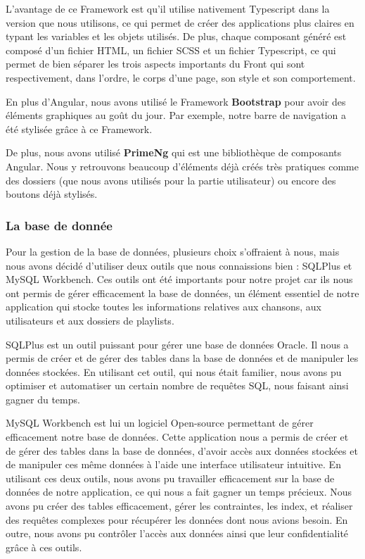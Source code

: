 \documentclass[12pt,french]{article}
\begin{document}
\medskip

L'avantage de ce \gls{Framework} est qu'il utilise nativement \gls{Typescript} dans la version que nous utilisons, ce qui permet de créer des applications plus claires en typant les variables et les objets utilisés. De plus, chaque composant généré est composé d'un fichier \gls{HTML}, un fichier \gls{SCSS} et un fichier \gls{Typescript}, ce qui permet de bien séparer les trois aspects importants du \gls{Front} qui sont respectivement, dans l'ordre, le corps d'une page, son style et son comportement.

\bigskip

En plus d'Angular, nous avons utilisé le \gls{Framework} \textbf{Bootstrap} pour avoir des éléments graphiques au goût du jour. Par exemple, notre barre de navigation a été stylisée grâce à ce \gls{Framework}.

De plus, nous avons utilisé \textbf{PrimeNg} qui est une bibliothèque de composants Angular. Nous y retrouvons beaucoup d'éléments déjà créés très pratiques comme des dossiers (que nous avons utilisés pour la partie utilisateur) ou encore des boutons déjà stylisés.

\subsubsection{La base de donnée}

Pour la gestion de la base de données, plusieurs choix s'offraient à nous, mais nous avons décidé d'utiliser deux outils que nous connaissions bien : SQLPlus et MySQL Workbench. Ces outils ont été importants pour notre projet car ils nous ont permis de gérer efficacement la base de données, un élément essentiel de notre application qui stocke toutes les informations relatives aux chansons, aux utilisateurs et aux dossiers de playlists.
\newline

SQLPlus est un outil puissant pour gérer une base de données Oracle. Il nous a permis de créer et de gérer des \gls{table}s dans la base de données et de manipuler les données stockées. En utilisant cet outil, qui nous était familier, nous avons pu optimiser et automatiser un certain nombre de requêtes \gls{SQL}, nous faisant ainsi gagner du temps.
\newline

MySQL Workbench est lui un logiciel \gls{Open-source} permettant de gérer efficacement notre base de données. Cette application nous a permis de créer et de gérer des \gls{table}s dans la base de données, d'avoir accès aux données stockées et de manipuler ces même données à l'aide une interface utilisateur intuitive.
\newline
En utilisant ces deux outils, nous avons pu travailler efficacement sur la base de données de notre application, ce qui nous a fait gagner un temps précieux. Nous avons pu créer des \gls{table}s efficacement, gérer les contraintes, les index, et réaliser des requêtes complexes pour récupérer les données dont nous avions besoin. En outre, nous avons pu contrôler l'accès aux données ainsi que leur confidentialité grâce à ces outils.
\end{document}
